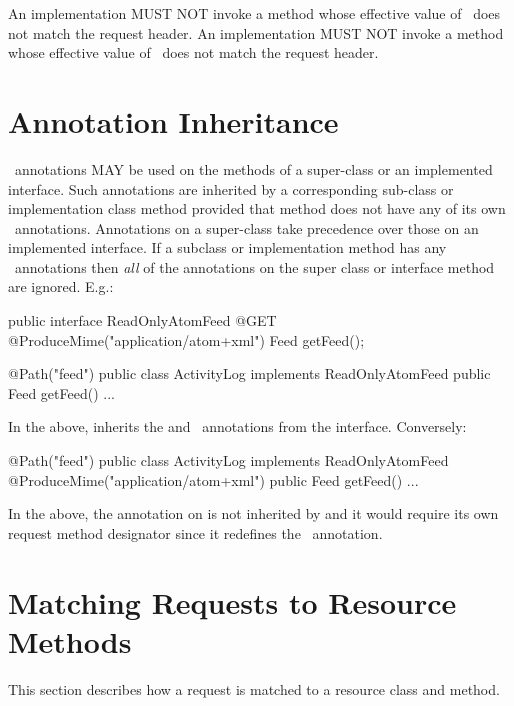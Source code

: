 An implementation MUST NOT invoke a method whose effective value of \ProduceMime\ does not match the request  header. An implementation MUST NOT invoke a method whose effective value of \ConsumeMime\ does not match the request  header.

\section{Annotation Inheritance}

\jaxrs\ annotations MAY be used on the methods of a super-class or an implemented interface. Such annotations are inherited by a corresponding sub-class or implementation class method provided that method does not have any of its own \jaxrs\ annotations. Annotations on a super-class take precedence over those on an implemented interface. If a subclass or implementation method has any \jaxrs\ annotations then {\em all} of the annotations on the super class or interface method are ignored. E.g.:

\begin{listing}{1}
public interface ReadOnlyAtomFeed {
  @GET @ProduceMime("application/atom+xml")
  Feed getFeed();
}

@Path("feed")
public class ActivityLog implements ReadOnlyAtomFeed {
  public Feed getFeed() {...}
}
\end{listing}

In the above,  inherits the  and \ProduceMime\ annotations from the interface. Conversely:

\begin{listing}{1}
@Path("feed")
public class ActivityLog implements ReadOnlyAtomFeed {
  @ProduceMime("application/atom+xml")
  public Feed getFeed() {...}
}
\end{listing}

In the above, the  annotation on  is not inherited by  and it would require its own request method designator since it redefines the \ProduceMime\ annotation.

\section{Matching Requests to Resource Methods}
\label{mapping_requests_to_java_methods}

This section describes how a request is matched to a resource class and method.

